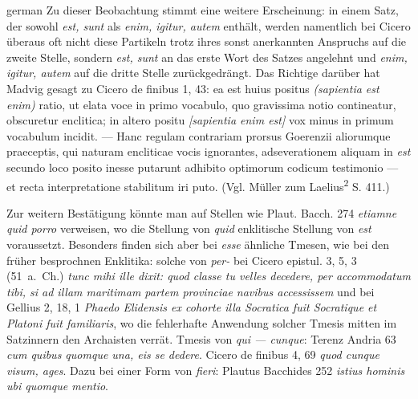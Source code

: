 \begin{otherlanguage*}{german}
Zu dieser Beobachtung stimmt eine weitere Erscheinung: in einem Satz, der sowohl \emph{est, sunt} als \emph{enim, igitur, autem} enthält, werden namentlich bei Cicero überaus oft nicht diese Partikeln trotz ihres sonst anerkannten Anspruchs auf die zweite Stelle, sondern \emph{est, sunt} an das erste Wort des Satzes angelehnt und \emph{enim, igitur, autem} auf die dritte Stelle zurückgedrängt. Das Richtige darüber hat Madvig gesagt zu Cicero de finibus 1, 43: ea est huius positus \emph{(sapientia est enim)} ratio, ut elata voce in primo vocabulo, quo gravissima notio contineatur, obscuretur enclitica; in altero positu \emph{[sapientia enim est]} vox minus in primum vocabulum incidit. — Hanc regulam contrariam prorsus Goerenzii aliorumque praeceptis, qui naturam encliticae vocis ignorantes, adseverationem aliquam in \emph{est} secundo loco posito inesse putarunt adhibito optimorum codicum testimonio — et recta interpretatione stabilitum iri puto. (Vgl. Müller zum Laelius\textsuperscript{2} S. 411.)

Zur weitern Bestätigung könnte man auf Stellen wie Plaut. Bacch. 274 \emph{etiamne  quid porro} verweisen, wo die Stellung von \emph{quid} enklitische Stellung von \emph{est} voraussetzt. Besonders finden sich aber bei \emph{esse} ähnliche Tmesen, wie bei den früher besprochnen Enklitika: solche von \emph{per-} bei Cicero epistul. 3, 5, 3 (51~a.~Ch.) \emph{tunc mihi ille dixit: quod classe tu velles decedere, per  accommodatum tibi, si ad illam maritimam partem provinciae navibus accessissem} und bei Gellius 2, 18, 1 \emph{Phaedo Elidensis ex cohorte illa Socratica fuit Socratique et Platoni  fuit familiaris}, wo die fehlerhafte Anwendung solcher Tmesis mitten im Satzinnern den Archaisten verrät. Tmesis von \emph{qui — cunque}: Terenz Andria 63 \emph{cum quibus  quomque una, eis se dedere}. Cicero de finibus 4, 69 \emph{quod  cunque visum, ages}. Dazu bei einer Form von \emph{fieri}: Plautus Bacchides 252 \emph{istius hominis ubi  quomque mentio}.


\end{otherlanguage*}
